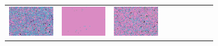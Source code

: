 \documentclass{ipol}
\begin{document}
\begin{figure}[ht]
\begin{subfigure}[t]{\linewidth}
\begin{tabular}{ccccccccc}
                \includegraphics[width=\s]{images/tower/DHT/bid_n5_64_grids.png}&
                \includegraphics[width=\s]{images/tower/LINEAR/bid_n5_64_grids.png}&
                \includegraphics[width=\s]{images/tower/PPG/bid_n5_64_grids.png}&

\end{tabular}
\end{subfigure}
\end{figure}
\end{document}
